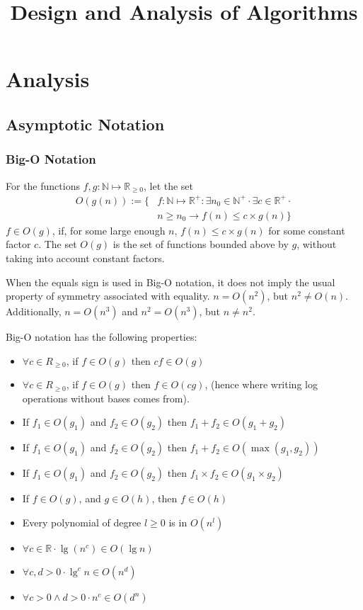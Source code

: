 \documentclass[10pt]{article}
\title{Design and Analysis of Algorithms}
\author{}\date{}
\begin{document}
\twocolumn
\maketitle
\tableofcontents
\listofalgorithms
\section{Analysis}
\subsection{Asymptotic Notation}
\subsubsection{Big-O Notation}
For the functions $f,g:\mathbb N\mapsto \mathbb R_{\ge0}$, let the set
\begin{align*}
	O(g(n)) :=\{&f:\mathbb N\mapsto \mathbb R^+ : \exists n_0\in\mathbb N^+ \cdot \exists c \in \mathbb R^+ \cdot\\
			  & n \ge n_0 \rightarrow f(n) \le c \times g(n)\}
\end{align*}
$f\in O(g)$, if, for some large enough $n$, $f(n)\le c\times g(n)$ for some constant factor $c$.  The set $O(g)$ is the set of functions bounded above by $g$, without taking into account constant factors.

When the equals sign is used in Big-O notation, it does not imply the usual property of symmetry associated with equality. $n=O(n^2)$, but $n^2\neq O(n)$.  Additionally, $n=O(n^3)$ and $n^2=O(n^3)$, but $n\neq n^2$.

Big-O notation has the following properties:
\begin{itemize}
	\item $\forall c \in R_{\ge0}$, if $f\in O(g)$ then $cf\in O(g)$
	\item $\forall c \in R_{\ge0}$, if $f\in O(g)$ then $f\in O(cg)$, (hence where writing log operations without bases comes from).
	\item If $f_1\in O\left( g_1 \right)$ and $f_2\in O\left( g_2 \right)$ then $f_1+f_2\in O\left( g_1+g_2 \right)$
	\item If $f_1\in O\left( g_1 \right)$ and $f_2\in O\left( g_2 \right)$ then $f_1+f_2\in O\left( \max\left(g_1,g_2\right) \right)$
	\item If $f_1\in O\left( g_1 \right)$ and $f_2\in O\left( g_2 \right)$ then $f_1\times f_2\in O\left( g_1\times g_2 \right)$
	\item If $f\in O\left( g \right)$, and $g\in O\left( h \right)$, then $f\in O(h)$
	\item Every polynomial of degree $l\ge 0$ is in $O\left( n^l \right)$
	\item $\forall c\in \mathbb R\cdot \lg\left( n^c \right)\in O\left( \lg n \right)$
	\item $\forall c,d>0 \cdot \lg^cn\in O\left( n^d \right)$
	\item $\forall c >0\land d>0 \cdot n^c\in O\left( d^n \right)$
\end{itemize}
\end{document}
